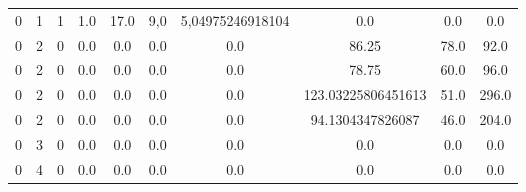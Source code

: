 \begin{table}[ht]
{\begin{tabular}{SSSSSSSSSS}
      0                         & 1                 & 1 & 1.0   & 17.0  & 9,0              & 5,04975246918104 & 0.0                & 0.0  & 0.0   \\
      0                         & 2                 & 0 & 0.0   & 0.0   & 0.0              & 0.0              & 86.25              & 78.0 & 92.0  \\
      0                         & 2                 & 0 & 0.0   & 0.0   & 0.0              & 0.0              & 78.75              & 60.0 & 96.0  \\
      0                         & 2                 & 0 & 0.0   & 0.0   & 0.0              & 0.0              & 123.03225806451613 & 51.0 & 296.0 \\
      0                         & 2                 & 0 & 0.0   & 0.0   & 0.0              & 0.0              & 94.1304347826087   & 46.0 & 204.0 \\
      0                         & 3                 & 0 & 0.0   & 0.0   & 0.0              & 0.0              & 0.0                & 0.0  & 0.0   \\
      0                         & 4                 & 0 & 0.0   & 0.0   & 0.0              & 0.0              & 0.0                & 0.0  & 0.0   \\
      \bottomrule
    \end{tabular}\label{table:feature_table_example}
  }
\end{table}
